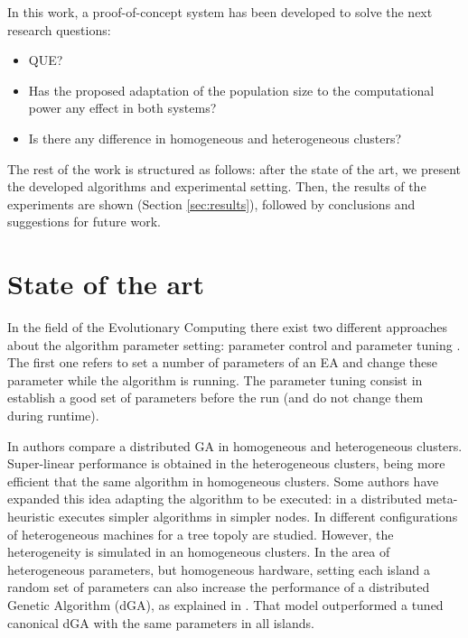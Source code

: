 \documentclass{sig-alternate}
\begin{document}
In this work, a proof-of-concept system has been developed to solve the next research questions:
\begin{itemize}
 \item QUE?
 \item Has the proposed adaptation of the population size to the computational power any effect in both systems?
 \item Is there any difference in homogeneous and heterogeneous clusters?
\end{itemize}


The rest of the work is structured as follows: after the state of
the art, we present the developed algorithms and experimental setting. 
Then, the results of the experiments are shown (Section \ref{sec:results}), followed by conclusions and suggestions for future work.


%
\section{State of the art}
\label{sec:soa}
%

In the field of the Evolutionary Computing there exist two different approaches about the algorithm parameter setting: parameter control and parameter tuning \cite{PARAMETERTUNING}. The first one refers to set a number of parameters of an EA and change these parameter while the algorithm is running. The parameter tuning consist in establish a good set of parameters before the run (and do not change them during runtime).

 In \cite{HETEROGENEOUSHARD} authors compare a distributed GA in homogeneous and heterogeneous clusters. Super-linear performance is obtained in the heterogeneous clusters, being more efficient that the same algorithm in homogeneous clusters. Some authors have expanded this idea adapting the algorithm to be executed: in \cite{HYDROCM} a distributed meta-heuristic executes simpler algorithms in simpler nodes. In \cite{HETEROGENEOUSTOPOLOGY} different configurations of heterogeneous machines for a tree topoly are studied. However, the heterogeneity is simulated in an homogeneous clusters. In the area of heterogeneous parameters, but homogeneous hardware, setting each island a random set of parameters can also increase the performance of a distributed Genetic Algorithm (dGA), as explained in \cite{HETEROGENEOUSPARAMETERS}. That model outperformed a tuned canonical dGA with the same parameters in all islands. 
\end{document}
